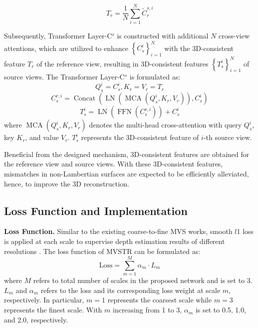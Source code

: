 \documentclass[10pt,twocolumn,letterpaper]{article}
\begin{document}
\begin{equation}
T_{r}=\frac{1}{N} \sum_{i=1}^{N} \widetilde{C}_{r}^{s, i}
\label{eq.9}
\end{equation}

Subsequently, Transformer Layer-C$^{s}$ is constructed with additional $N$ cross-view attentions, which are utilized to enhance $\left\{C_{s}^{i}\right\}_{i=1}^{N}$ with the 3D-consistent feature $T_{r}$ of the reference view, resulting in 3D-consistent features $\left\{T_{s}^{i}\right\}_{i=1}^{N}$ of source views. The Transformer Layer-C$^{s}$ is formulated as:
\begin{equation}
Q_{s}^{i}=C_{s}^{i}, K_{r}=V_{r}=T_{r}
\label{eq.10}
\end{equation}
\begin{equation}
{C}_{s}^{r, i}=\operatorname{Concat}\left(\operatorname{LN}\left(\operatorname{MCA}\left(Q_{s}^{i}, K_{r}, V_{r}\right)\right), C_{s}^{i}\right)
\label{eq.11}
\end{equation}
\begin{equation}
T_{s}^{i}=\operatorname{LN}\left(\operatorname{FFN}\left({C}_{s}^{r, i}\right)\right)+C_{s}^{i}
\label{eq.12}
\end{equation}
where $\operatorname{MCA}\left(Q_{s}^{i}, K_{r}, V_{r}\right)$ denotes the multi-head cross-attention with query $Q_{s}^{i}$, key $K_{r}$, and value $V_{r}$. $T_{s}^{i}$ represents the 3D-consistent feature of $i$-th source view.

Beneficial from the designed mechanism, 3D-consistent features are obtained for the reference view and source views. With these 3D-consistent features, mismatches in non-Lambertian surfaces are expected to be efficiently alleviated, hence, to improve the 3D reconstruction.

\subsection{Loss Function and Implementation}

{\bf{Loss Function.}} Similar to the existing coarse-to-fine MVS works, smooth $l$1 loss is applied at each scale to supervise depth estimation results of different resolutions \cite{casmvsnet}. The loss function of MVSTR can be formulated as:
\begin{equation}
\text {Loss}=\sum_{m=1}^{M} \alpha_{m} \cdot L_{m}
\label{eq.13}
\end{equation}
where $M$ refers to total number of scales in the proposed network and is set to 3. $L_{m}$ and $\alpha_{m}$ refers to the loss and its corresponding loss weight at scale $m$, respectively. In particular,  $m=1$ represents the coarsest scale while $m=3$ represents the finest scale. With $m$ increasing from 1 to 3, $\alpha_{m}$ is set to 0.5, 1.0, and 2.0, respectively.
\end{document}
